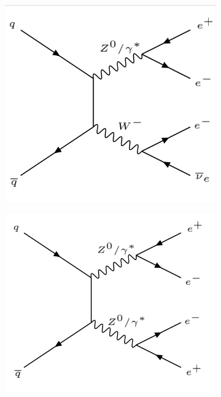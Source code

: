 \documentclass{article}
\begin{document}
\begin{figure}[htb]
\begin{subfigure}{.25\textwidth}
        \caption{}
        \label{fig:bckgFeynman_WW}
    \end{subfigure}
    \begin{subfigure}{.25\textwidth}
        \includegraphics[height=\textwidth]{images/WZ.png}
        \caption{}
        \label{fig:bckgFeynman_WZ}
    \end{subfigure}
    \begin{subfigure}{.25\textwidth}
        \includegraphics[height=\textwidth]{images/ZZ.png}

\end{subfigure}
\end{figure}
\end{document}
